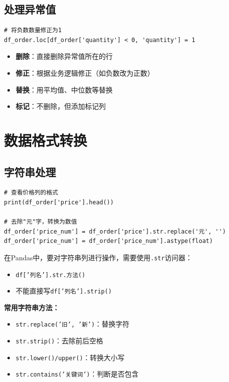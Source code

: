 \documentclass[12pt,a4paper]{article}
\begin{document}
\subsection{处理异常值}

\begin{lstlisting}[caption={处理异常值}]
# 将负数数量修正为1
df_order.loc[df_order['quantity'] < 0, 'quantity'] = 1
\end{lstlisting}

\begin{knowledgebox}
\begin{itemize}
    \item \textbf{删除}：直接删除异常值所在的行
    \item \textbf{修正}：根据业务逻辑修正（如负数改为正数）
    \item \textbf{替换}：用平均值、中位数等替换
    \item \textbf{标记}：不删除，但添加标记列
\end{itemize}
\end{knowledgebox}

\section{数据格式转换}

\subsection{字符串处理}

\begin{lstlisting}[caption={处理价格列}]
# 查看价格列的格式
print(df_order['price'].head())

# 去除"元"字，转换为数值
df_order['price_num'] = df_order['price'].str.replace('元', '')
df_order['price_num'] = df_order['price_num'].astype(float)
\end{lstlisting}

\begin{knowledgebox}
在Pandas中，要对字符串列进行操作，需要使用\texttt{.str}访问器：

\begin{itemize}
    \item \texttt{df['列名'].str.方法()}
    \item 不能直接写\texttt{df['列名'].strip()}
\end{itemize}

\textbf{常用字符串方法：}
\begin{itemize}
    \item \texttt{str.replace('旧', '新')}：替换字符
    \item \texttt{str.strip()}：去除前后空格
    \item \texttt{str.lower()/upper()}：转换大小写
    \item \texttt{str.contains('关键词')}：判断是否包含
\end{itemize}
\end{knowledgebox}
\end{document}
